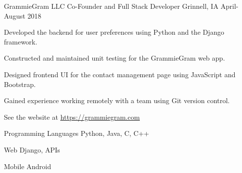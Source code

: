 \documentclass[12pt, a4paper]{awesome-cv}
\begin{document}
\begin{cventries}


  \cventry
    {GrammieGram LLC}
    {Co-Founder and Full Stack Developer}
    {Grinnell, IA}
    {April-August 2018}
    {
      \begin{cvitems}
        \item {Developed the backend for user preferences using Python and the Django framework.}
        \item {Constructed and maintained unit testing for the GrammieGram web app.}
        \item {Designed frontend UI for the contact management page using JavaScript and Bootstrap.}
        \item {Gained experience working remotely with a team using Git version control.}
	      \item {See the website at \underline{\href{https://grammiegram.com}{https://grammiegram.com}}}
      \end{cvitems}
    }



\end{cventries}


\begin{cvskills}
  \cvskill
    {Programming Languages} 
    {Python, Java, C, C++} 

  \cvskill
    {Web}
    {Django, APIs}

  \cvskill
    {Mobile}
    {Android}

\end{cvskills}
\end{document}
